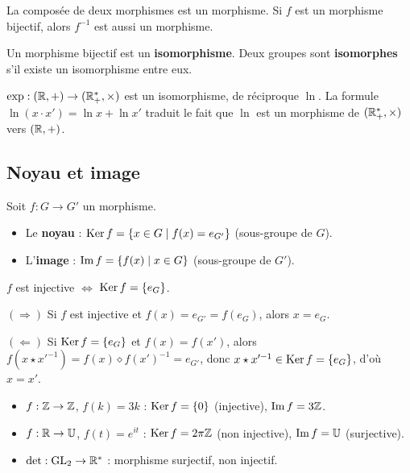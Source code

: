 \begin{propbox}
La composée de deux morphismes est un morphisme. Si $f$ est un morphisme bijectif, alors $f^{-1}$ est aussi un morphisme.
\end{propbox}

\begin{defbox}[--- Isomorphisme]
Un morphisme bijectif est un \textbf{isomorphisme}. Deux groupes sont \textbf{isomorphes} s'il existe un isomorphisme entre eux.
\end{defbox}

\begin{exbox}
$\exp : (\mathbb{R}, +) \to (\mathbb{R}^*_+, \times)$ est un isomorphisme, de réciproque $\ln$. La formule $\ln(x \cdot x') = \ln x + \ln x'$ traduit le fait que $\ln$ est un morphisme de $(\mathbb{R}^*_+, \times)$ vers $(\mathbb{R}, +)$.
\end{exbox}

\subsection{Noyau et image}

\begin{defbox}
Soit $f : G \to G'$ un morphisme.
\begin{itemize}[leftmargin=1cm]
  \item Le \textbf{noyau} : $\operatorname{Ker} f = \{x \in G \mid f(x) = e_{G'}\}$ (sous-groupe de $G$).
  \item L'\textbf{image} : $\operatorname{Im} f = \{f(x) \mid x \in G\}$ (sous-groupe de $G'$).
\end{itemize}
\end{defbox}

\begin{propbox}
$f$ est injective $\iff$ $\operatorname{Ker} f = \{e_G\}$.
\end{propbox}

\begin{proofbox}
$(\Rightarrow)$ Si $f$ est injective et $f(x) = e_{G'} = f(e_G)$, alors $x = e_G$.

$(\Leftarrow)$ Si $\operatorname{Ker} f = \{e_G\}$ et $f(x) = f(x')$, alors $f(x \star x'^{-1}) = f(x) \diamond f(x')^{-1} = e_{G'}$, donc $x \star x'^{-1} \in \operatorname{Ker} f = \{e_G\}$, d'où $x = x'$.
\end{proofbox}

\begin{exbox}
\begin{itemize}[leftmargin=1cm]
  \item $f : \mathbb{Z} \to \mathbb{Z}$, $f(k) = 3k$ : $\operatorname{Ker} f = \{0\}$ (injective), $\operatorname{Im} f = 3\mathbb{Z}$.
  \item $f : \mathbb{R} \to \mathbb{U}$, $f(t) = e^{it}$ : $\operatorname{Ker} f = 2\pi\mathbb{Z}$ (non injective), $\operatorname{Im} f = \mathbb{U}$ (surjective).
  \item $\det : \mathrm{GL}_2 \to \mathbb{R}^*$ : morphisme surjectif, non injectif.
\end{itemize}
\end{exbox}



